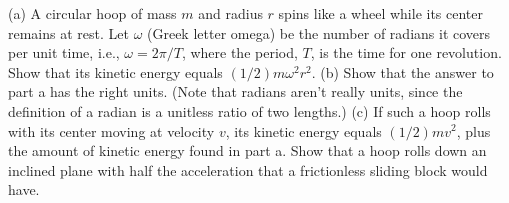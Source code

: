         (a) A circular hoop of mass $m$ and radius $r$ spins like a
        wheel while its center remains at rest.  Let $\omega$ (Greek letter omega) be 
        the number of radians it covers per unit time, i.e., $\omega=2\pi/T$, 
        where the
        period, $T$, is the time for one revolution.
        Show that its kinetic
        energy equals $(1/2)m\omega^2r^2$. \hwendpart
        (b) Show that the answer to part a
        has the right units. (Note that radians aren't really units, since the definition
        of a radian is a unitless ratio of two lengths.)\hwendpart
        (c) If such a hoop rolls with its
        center moving at velocity $v$, its kinetic energy
        equals $(1/2)mv^2$, plus the amount of kinetic energy found in
        part a. Show that a hoop rolls down
        an inclined plane with half the acceleration that a
        frictionless sliding block would have.
